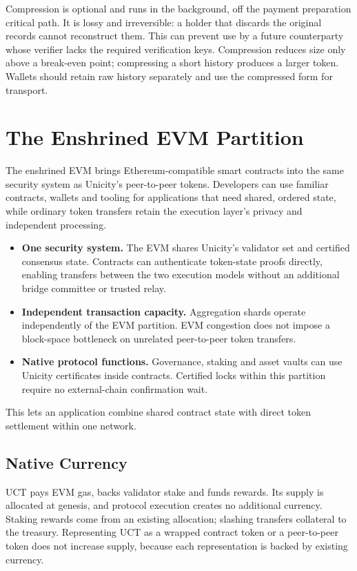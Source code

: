 Compression is optional and runs in the background, off the payment preparation critical path. It is lossy and irreversible: a holder that discards the original records cannot reconstruct them. This can prevent use by a future counterparty whose verifier lacks the required verification keys. Compression reduces size only above a break-even point; compressing a short history produces a larger token. Wallets should retain raw history separately and use the compressed form for transport.

\section{The Enshrined EVM Partition}\label{sec:evm}

The enshrined EVM brings Ethereum-compatible smart contracts into the same security system as Unicity's peer-to-peer tokens. Developers can use familiar contracts, wallets and tooling for applications that need shared, ordered state, while ordinary token transfers retain the execution layer's privacy and independent processing.

\begin{itemize}
    \item \textbf{One security system.} The EVM shares Unicity's validator set and certified consensus state. Contracts can authenticate token-state proofs directly, enabling transfers between the two execution models without an additional bridge committee or trusted relay.
    \item \textbf{Independent transaction capacity.} Aggregation shards operate independently of the EVM partition. EVM congestion does not impose a block-space bottleneck on unrelated peer-to-peer token transfers.
    \item \textbf{Native protocol functions.} Governance, staking and asset vaults can use Unicity certificates inside contracts. Certified locks within this partition require no external-chain confirmation wait.
\end{itemize}

This lets an application combine shared contract state with direct token settlement within one network.

\subsection{Native Currency}

UCT pays EVM gas, backs validator stake and funds rewards. Its supply is allocated at genesis, and protocol execution creates no additional currency. Staking rewards come from an existing allocation; slashing transfers collateral to the treasury. Representing UCT as a wrapped contract token or a peer-to-peer token does not increase supply, because each representation is backed by existing currency.

